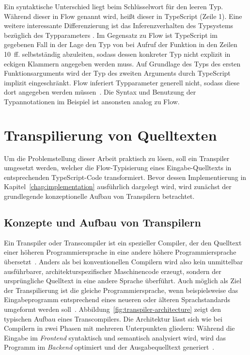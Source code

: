 Ein syntaktische Unterschied liegt beim Schlüsselwort für den leeren Typ. Während dieser in Flow  genannt wird, heißt dieser in TypeScript  (Zeile 1).
Eine weitere interessante Differenzierung ist das Inferenzverhalten des Typsystems bezüglich des Typparameters . Im Gegensatz zu Flow ist TypeScript im gegebenen Fall in der Lage den Typ von  bei Aufruf der Funktion  in den Zeilen 10~ff. selbstständig abzuleiten, sodass dessen konkreter Typ nicht explizit in eckigen Klammern angegeben werden muss.  Auf Grundlage des Typs des ersten Funktionsarguments wird der Typ des zweiten Arguments durch TypeScript implizit eingeschränkt. Flow inferiert Typparameter generell nicht, sodass diese dort angegeben werden müssen~\autocite{FLOW:GENERICS}. Die Syntax und Benutzung der Typannotationen im Beispiel ist ansonsten analog zu Flow.

\section{Transpilierung von Quelltexten}
\label{sec:transpilers}

Um die Problemstellung dieser Arbeit praktisch zu lösen, soll ein Transpiler umgesetzt werden, welcher die Flow-Typisierung eines Eingabe-Quelltexts in entsprechenden TypeScript-Code transformiert. Bevor dessen Implementierung in Kapitel~\ref{chap:implementation} ausführlich dargelegt wird, wird zunächst der grundlegende konzeptionelle Aufbau von Transpilern betrachtet.

\subsection{Konzepte und Aufbau von Transpilern}

Ein Transpiler oder Transcompiler ist ein spezieller Compiler, der den Quelltext einer höheren Programmiersprache in eine andere höhere Programmiersprache übersetzt~\autocite[3]{AHO:COMPILERS}. Anders als bei konventionellen Compilern wird also kein unmittelbar ausführbarer, architekturspezifischer Maschinencode erzeugt, sondern der ursprüngliche Quelltext in eine andere Sprache überführt. Auch möglich als Ziel der Transpilierung ist die gleiche Programmiersprache, wenn beispielsweise das Eingabeprogramm entsprechend eines neueren oder älteren Sprachstandards umgeformt werden soll~\autocite{EVGENIY:2016}.
Abbildung~\ref{fig:transpiler-architecture} zeigt den typischen Aufbau eines Transcompilers. Die Architektur lässt sich wie bei Compilern in zwei Phasen mit mehreren Unterpunkten gliedern: Während die Eingabe im \emph{Frontend} syntaktisch und semantisch analysiert wird, wird das Programm im \emph{Backend} optimiert und der Ausgabequelltext generiert~\autocite[136]{APPEL:2003}.

